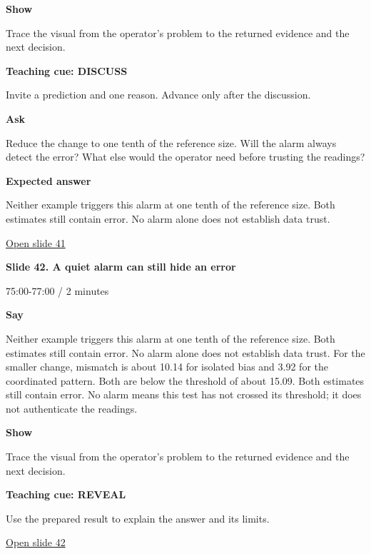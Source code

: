 \documentclass[12pt,letterpaper]{article}
\begin{document}
\textbf{Show}\par Trace the visual from the operator's problem to the returned evidence and the next decision.\par\medskip
\textbf{Teaching cue: DISCUSS}\par Invite a prediction and one reason. Advance only after the discussion.\par\medskip
\textbf{Ask}\par Reduce the change to one tenth of the reference size. Will the alarm always detect the error? What else would the operator need before trusting the readings?\par\textbf{Expected answer}\par Neither example triggers this alarm at one tenth of the reference size. Both estimates still contain error. No alarm alone does not establish data trust.\par\medskip
\vfill\href{https://alaaselim-sudo.github.io/GridGuard-Agentic-AI-Tutorials/operator-cases/#/41}{Open slide 41}\par
\clearpage{}
{\Large\bfseries\color{IEEEBlue} Slide 42. A quiet alarm can still hide an error\par}\medskip
{\small\color{Slate} 75:00-77:00 /\allowbreak{} 2 minutes\par}\medskip
\textbf{Say}\par Neither example triggers this alarm at one tenth of the reference size. Both estimates still contain error. No alarm alone does not establish data trust. For the smaller change, mismatch is about 10.14 for isolated bias and 3.92 for the coordinated pattern. Both are below the threshold of about 15.09. Both estimates still contain error. No alarm means this test has not crossed its threshold; it does not authenticate the readings.\par\medskip
\textbf{Show}\par Trace the visual from the operator's problem to the returned evidence and the next decision.\par\medskip
\textbf{Teaching cue: REVEAL}\par Use the prepared result to explain the answer and its limits.\par\medskip
\vfill\href{https://alaaselim-sudo.github.io/GridGuard-Agentic-AI-Tutorials/operator-cases/#/42}{Open slide 42}\par
\clearpage{}
\end{document}
